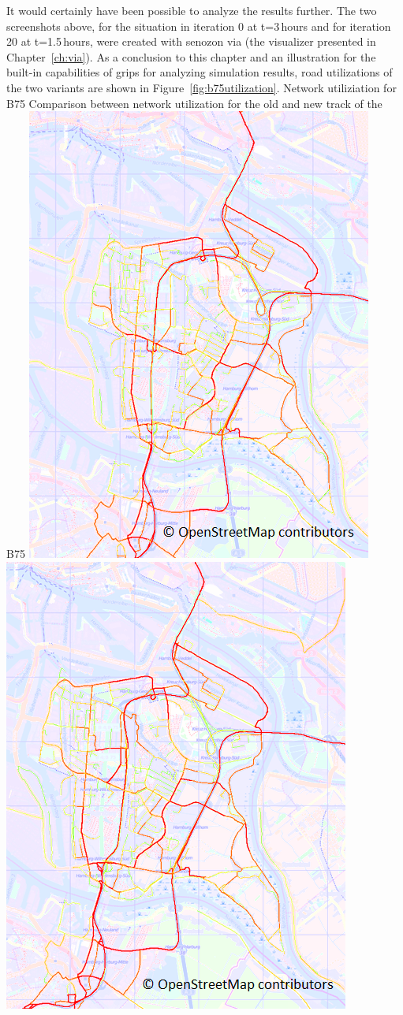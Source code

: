 It would certainly have been possible to analyze the results further. The two screenshots above, for the situation in iteration 0 at t=3\,hours and for iteration 20 at t=1.5\,hours, were created with \gls{senozon} \gls{via} (the visualizer presented in Chapter~\ref{ch:via}). As a conclusion to this chapter and an illustration for the built-in capabilities of \gls{grips} for analyzing simulation results, road utilizations of the two variants are shown in Figure~\ref{fig:b75utilization}.
%
\createfigure%
{Network utiliziation for B75}%
{Comparison between network utilization for the old and new track of the B75}%
{\label{fig:b75utilization}}%
{%
  \createsubfigure%
  {}%
  {\includegraphics[width=.475\linewidth]{scenarios/figures/b75utilizationold}}%
  {}%
  {}%
  \createsubfigure%
  {}%
  {\includegraphics[width=.475\linewidth]{scenarios/figures/b75utilizationnew}}
  {}%
  {}%
}%
  {}%
